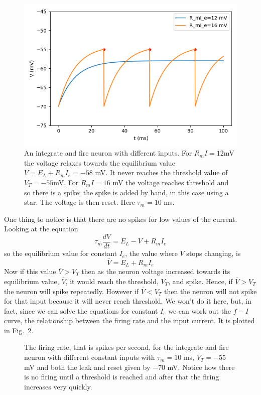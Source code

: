\documentclass[11pt,a4paper]{scrartcl}
\begin{document}
\begin{figure}
\begin{center}
\includegraphics{integrate_and_fire.png}
\end{center}
\caption{An integrate and fire neuron with different inputs. For
  $R_mI=12 $mV the voltage relaxes towards the equilibrium value
  $V=E_L+R_mI_e=-58$ mV. It never reaches the threshold value of
  $V_T=-55 $mV. For $R_mI=16$ mV the voltage reaches threshold and so
  there is a spike; the spike is added by hand, in this case using a
  star. The voltage is then reset. Here $\tau_m=10$ ms.\label{v_i_f}}
\end{figure}

One thing to notice is that there are no spikes for low values of the current. Looking at the equation 
\begin{equation}
\tau_m\frac{dV}{dt}=E_L-V+R_mI_e
\end{equation}
so the equilibrium value for constant $I_e$, the value where $V$ stops changing, is
\begin{equation}
\bar{V}=E_L+R_mI_e
\end{equation}
Now if this value $\bar{V}>V_T$ then as the neuron voltage increased
towards its equilibrium value, $\bar{V}$, it would reach the
threshold, $V_T$, and spike. Hence, if $\bar{V}>V_T$ the neuron will
spike repeatedly.  However if $\bar{V}<V_T$ then the neuron will not
spike for that input because it will never reach threshold. We won't do it here, but, in fact, since we can
solve the equations for constant $I_e$ we can work out the $f-I$
curve, the relationship between the firing rate and the input
current. It is plotted in Fig.~\ref{f_i_curve}.


\begin{figure}
\begin{center}

\end{center}
\caption{The firing rate, that is spikes per second, for the integrate
  and fire neuron with different constant inputs with $\tau_m=10$ ms,
  $V_T=-55$ mV and both the leak and reset given by $-70$ mV. Notice
  how there is no firing until a threshold is reached and after that
  the firing increases very quickly. \label{f_i_curve}}
\end{figure}
\end{document}
